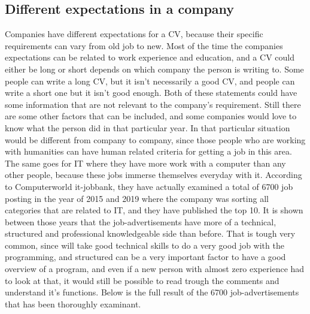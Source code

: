 



\subsection{Different expectations in a company}
Companies have different expectations for a CV, because their specific requirements can vary from old job to new.
Most of the time the companies expectations can be related to work experience and education,
and a CV could either be long or short depends on which company the person is writing to. Some people can write a long CV,
but it isn't necessarily a good CV, and people can write a short one but it isn't good enough.
Both of these statements could have some information that are not relevant to the company's requirement. Still there are some other
factors that can be included, and some companies would love to know what the person did in that particular year.
In that particular situation would be different from company to company, since those people who are working with humanities
can have human related criteria for getting a job in this area. The same goes for IT where they have more work with a computer
than any other people, because these jobs immerse themselves everyday with it. According to Computerworld it-jobbank,
they have actually examined a total of 6700 job posting in the year of 2015 and 2019 where the company was sorting all categories
that are related to IT, and they have published the top 10. It is shown between those years that the job-advertisements
have more of a technical, structured and professional knowledgeable side than before.
That is tough very common, since will take good technical skills to do a very good job with the programming,
and structured can be a very important factor to have a good overview of a program,
and even if a new person with almost zero experience had to look at that,
it would still be possible to read trough the comments and understand it's functions. Below is the full result
of the 6700 job-advertisements that has been thoroughly examinant.

